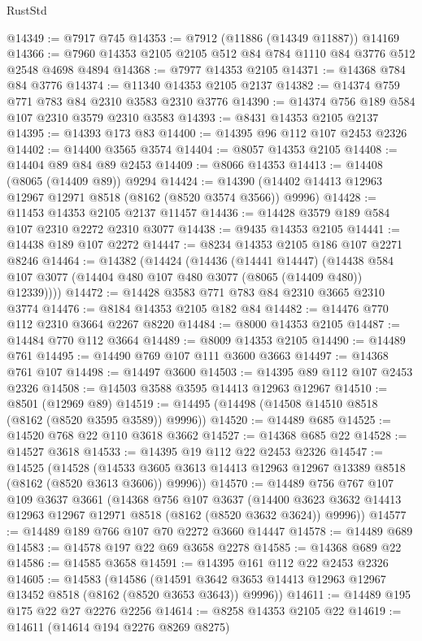 \begin{lexlean}{RustStd}
\begin{coremodule}
@14349 := @7917 @745
@14353 := @7912 (@11886 (@14349 @11887)) @14169
@14366 := @7960 @14353 @2105 @2105 @512 @84 @784 @1110 @84 @3776 @512 @2548 @4698 @4894
@14368 := @7977 @14353 @2105
@14371 := @14368 @784 @84 @3776
@14374 := @11340 @14353 @2105 @2137
@14382 := @14374 @759 @771 @783 @84 @2310 @3583 @2310 @3776
@14390 := @14374 @756 @189 @584 @107 @2310 @3579 @2310 @3583
@14393 := @8431 @14353 @2105 @2137
@14395 := @14393 @173 @83
@14400 := @14395 @96 @112 @107 @2453 @2326
@14402 := @14400 @3565 @3574
@14404 := @8057 @14353 @2105
@14408 := @14404 @89 @84 @89 @2453
@14409 := @8066 @14353
@14413 := @14408 (@8065 (@14409 @89)) @9294
@14424 := @14390 (@14402 @14413 @12963 @12967 @12971 @8518 (@8162 (@8520 @3574 @3566)) @9996)
@14428 := @11453 @14353 @2105 @2137 @11457
@14436 := @14428 @3579 @189 @584 @107 @2310 @2272 @2310 @3077
@14438 := @9435 @14353 @2105
@14441 := @14438 @189 @107 @2272
@14447 := @8234 @14353 @2105 @186 @107 @2271 @8246
@14464 := @14382
    (@14424
      (@14436
        (@14441 @14447)
        (@14438 @584 @107 @3077 (@14404 @480 @107 @480 @3077 (@8065 (@14409 @480)) @12339))))
@14472 := @14428 @3583 @771 @783 @84 @2310 @3665 @2310 @3774
@14476 := @8184 @14353 @2105 @182 @84
@14482 := @14476 @770 @112 @2310 @3664 @2267 @8220
@14484 := @8000 @14353 @2105
@14487 := @14484 @770 @112 @3664
@14489 := @8009 @14353 @2105
@14490 := @14489 @761
@14495 := @14490 @769 @107 @111 @3600 @3663
@14497 := @14368 @761 @107
@14498 := @14497 @3600
@14503 := @14395 @89 @112 @107 @2453 @2326
@14508 := @14503 @3588 @3595 @14413 @12963 @12967
@14510 := @8501 (@12969 @89)
@14519 := @14495 (@14498 (@14508 @14510 @8518 (@8162 (@8520 @3595 @3589)) @9996))
@14520 := @14489 @685
@14525 := @14520 @768 @22 @110 @3618 @3662
@14527 := @14368 @685 @22
@14528 := @14527 @3618
@14533 := @14395 @19 @112 @22 @2453 @2326
@14547 := @14525
    (@14528
      (@14533 @3605 @3613 @14413 @12963 @12967 @13389 @8518 (@8162 (@8520 @3613 @3606)) @9996))
@14570 := @14489
    @756
    @767
    @107
    @109
    @3637
    @3661
    (@14368
      @756
      @107
      @3637
      (@14400 @3623 @3632 @14413 @12963 @12967 @12971 @8518 (@8162 (@8520 @3632 @3624)) @9996))
@14577 := @14489 @189 @766 @107 @70 @2272 @3660 @14447
@14578 := @14489 @689
@14583 := @14578 @197 @22 @69 @3658 @2278
@14585 := @14368 @689 @22
@14586 := @14585 @3658
@14591 := @14395 @161 @112 @22 @2453 @2326
@14605 := @14583
    (@14586
      (@14591 @3642 @3653 @14413 @12963 @12967 @13452 @8518 (@8162 (@8520 @3653 @3643)) @9996))
@14611 := @14489 @195 @175 @22 @27 @2276 @2256
@14614 := @8258 @14353 @2105 @22
@14619 := @14611 (@14614 @194 @2276 @8269 @8275)

\end{coremodule}
\end{lexlean}
